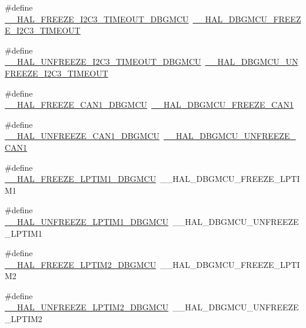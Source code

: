 \begin{DoxyCompactItemize}
\item 
\#define \hyperlink{group___h_a_l___d_b_g_m_c_u___aliased___macros_ga76b6e1661062fd15b339f73e4bf06425}{\+\_\+\+\_\+\+H\+A\+L\+\_\+\+F\+R\+E\+E\+Z\+E\+\_\+\+I2\+C3\+\_\+\+T\+I\+M\+E\+O\+U\+T\+\_\+\+D\+B\+G\+M\+CU}~\hyperlink{group___h_a_l___exported___macros_gacd3fd0373b45de1b86be07bd4007c30e}{\+\_\+\+\_\+\+H\+A\+L\+\_\+\+D\+B\+G\+M\+C\+U\+\_\+\+F\+R\+E\+E\+Z\+E\+\_\+\+I2\+C3\+\_\+\+T\+I\+M\+E\+O\+UT}
\item 
\#define \hyperlink{group___h_a_l___d_b_g_m_c_u___aliased___macros_gacf563c1860e9d768762ef5fbece8c9ee}{\+\_\+\+\_\+\+H\+A\+L\+\_\+\+U\+N\+F\+R\+E\+E\+Z\+E\+\_\+\+I2\+C3\+\_\+\+T\+I\+M\+E\+O\+U\+T\+\_\+\+D\+B\+G\+M\+CU}~\hyperlink{group___h_a_l___exported___macros_ga8beda05b7dc4962557f98a06e29326a4}{\+\_\+\+\_\+\+H\+A\+L\+\_\+\+D\+B\+G\+M\+C\+U\+\_\+\+U\+N\+F\+R\+E\+E\+Z\+E\+\_\+\+I2\+C3\+\_\+\+T\+I\+M\+E\+O\+UT}
\item 
\#define \hyperlink{group___h_a_l___d_b_g_m_c_u___aliased___macros_ga1781f9a122328bdfd756224f4ddb3414}{\+\_\+\+\_\+\+H\+A\+L\+\_\+\+F\+R\+E\+E\+Z\+E\+\_\+\+C\+A\+N1\+\_\+\+D\+B\+G\+M\+CU}~\hyperlink{group___h_a_l___exported___macros_ga1d225003f36f6a22ffea1a41a4a78cec}{\+\_\+\+\_\+\+H\+A\+L\+\_\+\+D\+B\+G\+M\+C\+U\+\_\+\+F\+R\+E\+E\+Z\+E\+\_\+\+C\+A\+N1}
\item 
\#define \hyperlink{group___h_a_l___d_b_g_m_c_u___aliased___macros_ga2481aaaf4c950e9ecb27fe5616115164}{\+\_\+\+\_\+\+H\+A\+L\+\_\+\+U\+N\+F\+R\+E\+E\+Z\+E\+\_\+\+C\+A\+N1\+\_\+\+D\+B\+G\+M\+CU}~\hyperlink{group___h_a_l___exported___macros_gad580d0ec1c7b8eb8d5935e1fcbd58b07}{\+\_\+\+\_\+\+H\+A\+L\+\_\+\+D\+B\+G\+M\+C\+U\+\_\+\+U\+N\+F\+R\+E\+E\+Z\+E\+\_\+\+C\+A\+N1}
\item 
\#define \hyperlink{group___h_a_l___d_b_g_m_c_u___aliased___macros_ga834e086b504768fe1c93f807e99a6182}{\+\_\+\+\_\+\+H\+A\+L\+\_\+\+F\+R\+E\+E\+Z\+E\+\_\+\+L\+P\+T\+I\+M1\+\_\+\+D\+B\+G\+M\+CU}~\+\_\+\+\_\+\+H\+A\+L\+\_\+\+D\+B\+G\+M\+C\+U\+\_\+\+F\+R\+E\+E\+Z\+E\+\_\+\+L\+P\+T\+I\+M1
\item 
\#define \hyperlink{group___h_a_l___d_b_g_m_c_u___aliased___macros_ga2f9eea260a1f4d006e8b00b05816e7ba}{\+\_\+\+\_\+\+H\+A\+L\+\_\+\+U\+N\+F\+R\+E\+E\+Z\+E\+\_\+\+L\+P\+T\+I\+M1\+\_\+\+D\+B\+G\+M\+CU}~\+\_\+\+\_\+\+H\+A\+L\+\_\+\+D\+B\+G\+M\+C\+U\+\_\+\+U\+N\+F\+R\+E\+E\+Z\+E\+\_\+\+L\+P\+T\+I\+M1
\item 
\#define \hyperlink{group___h_a_l___d_b_g_m_c_u___aliased___macros_gad0e137ee9aa05347e1ffde48f9820f34}{\+\_\+\+\_\+\+H\+A\+L\+\_\+\+F\+R\+E\+E\+Z\+E\+\_\+\+L\+P\+T\+I\+M2\+\_\+\+D\+B\+G\+M\+CU}~\+\_\+\+\_\+\+H\+A\+L\+\_\+\+D\+B\+G\+M\+C\+U\+\_\+\+F\+R\+E\+E\+Z\+E\+\_\+\+L\+P\+T\+I\+M2
\item 
\#define \hyperlink{group___h_a_l___d_b_g_m_c_u___aliased___macros_ga7490754801ed1bcaf3e31d15757a883c}{\+\_\+\+\_\+\+H\+A\+L\+\_\+\+U\+N\+F\+R\+E\+E\+Z\+E\+\_\+\+L\+P\+T\+I\+M2\+\_\+\+D\+B\+G\+M\+CU}~\+\_\+\+\_\+\+H\+A\+L\+\_\+\+D\+B\+G\+M\+C\+U\+\_\+\+U\+N\+F\+R\+E\+E\+Z\+E\+\_\+\+L\+P\+T\+I\+M2
\end{DoxyCompactItemize}


